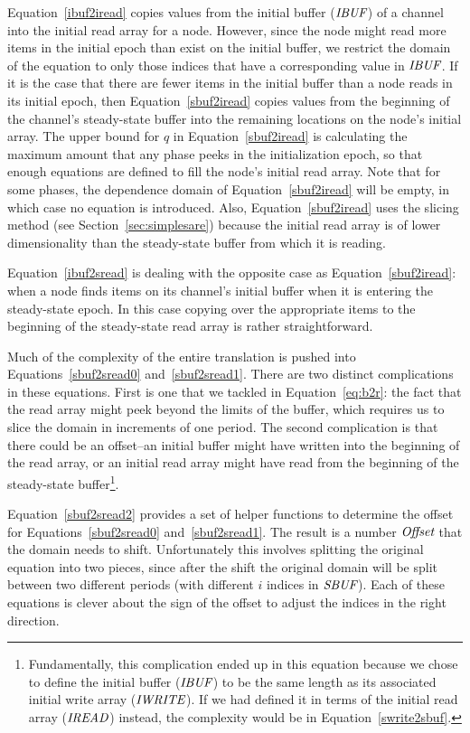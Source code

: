 Equation~\ref{ibuf2iread} copies values from the initial buffer
($\mbox{\it IBUF}$) of a channel into the initial read array for a node.
However, since the node might read more items in the initial epoch
than exist on the initial buffer, we restrict the domain of the
equation to only those indices that have a corresponding value in
$\mbox{\it IBUF}$.  If it is the case that there are fewer items in the
initial buffer than a node reads in its initial epoch, then
Equation~\ref{sbuf2iread} copies values from the beginning of the
channel's steady-state buffer into the remaining locations on the
node's initial array.  The upper bound for $q$ in
Equation~\ref{sbuf2iread} is calculating the maximum amount that any
phase peeks in the initialization epoch, so that enough equations are
defined to fill the node's initial read array.  Note that for some
phases, the dependence domain of Equation~\ref{sbuf2iread} will be
empty, in which case no equation is introduced.  Also,
Equation~\ref{sbuf2iread} uses the slicing method (see
Section~\ref{sec:simplesare}) because the initial read array is of
lower dimensionality than the steady-state buffer from which it is
reading.

Equation~\ref{ibuf2sread} is dealing with the opposite case as
Equation~\ref{sbuf2iread}: when a node finds items on its channel's
initial buffer when it is entering the steady-state epoch.  In this
case copying over the appropriate items to the beginning of the
steady-state read array is rather straightforward.

Much of the complexity of the entire translation is pushed into
Equations~\ref{sbuf2sread0} and~\ref{sbuf2sread1}.  There are two
distinct complications in these equations.  First is one that we
tackled in Equation~\ref{eq:b2r}: the fact that the read array might
peek beyond the limits of the buffer, which requires us to slice the
domain in increments of one period.  The second complication is that
there could be an offset--an initial buffer might have written into
the beginning of the read array, or an initial read array might have
read from the beginning of the steady-state
buffer\footnote{Fundamentally, this complication ended up in this
equation because we chose to define the initial buffer ($\mbox{\it IBUF}$)
to be the same length as its associated initial write array
($\mbox{\it IWRITE}$).  If we had defined it in terms of the initial read
array ($\mbox{\it IREAD}$) instead, the complexity would be in
Equation~\ref{swrite2sbuf}.}.

Equation~\ref{sbuf2sread2} provides a set of helper functions to
determine the offset for Equations~\ref{sbuf2sread0}
and~\ref{sbuf2sread1}.  The result is a number $\mbox{\it Offset}$ that the
domain needs to shift.  Unfortunately this involves splitting the
original equation into two pieces, since after the shift the original
domain will be split between two different periods (with different $i$
indices in $\mbox{\it SBUF}$).  Each of these equations is clever about the
sign of the offset to adjust the indices in the right direction.
